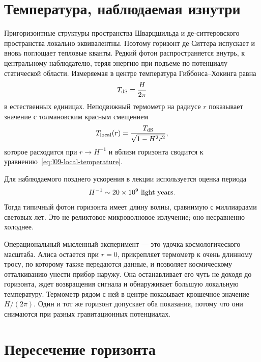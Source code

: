 \section{Температура, наблюдаемая изнутри}

Пригоризонтные структуры пространства Шварцшильда и де-ситтеровского пространства локально эквивалентны. Поэтому горизонт де Ситтера испускает и вновь поглощает тепловые кванты. Редкий фотон распространяется внутрь, к центральному наблюдателю, теряя энергию при подъеме по потенциалу статической области. Измеряемая в центре температура Гиббонса--Хокинга равна
\begin{equation}
T_{\rm dS}=\frac{H}{2\pi}
\label{eq:l09-de-sitter-temperature}
\end{equation}
в естественных единицах. Неподвижный термометр на радиусе \(r\) показывает значение с толмановским красным смещением
\begin{equation}
T_{\rm local}(r)=
\frac{T_{\rm dS}}{\sqrt{1-H^2r^2}},
\label{eq:l09-tolman}
\end{equation}
которое расходится при \(r\to H^{-1}\) и вблизи горизонта сводится к уравнению~\eqref{eq:l09-local-temperature}.


Для наблюдаемого позднего ускорения в лекции используется оценка периода
\begin{equation}
H^{-1}\sim 20\times10^9\ {\rm light\ years}.
\label{eq:l09-lecture-horizon-estimate}
\end{equation}
Тогда типичный фотон горизонта имеет длину волны, сравнимую с миллиардами световых лет. Это не реликтовое микроволновое излучение; оно несравненно холоднее.

Операциональный мысленный эксперимент — это удочка космологического масштаба. Алиса остается при \(r=0\), прикрепляет термометр к очень длинному тросу, по которому также передаются данные, и позволяет космическому отталкиванию унести прибор наружу. Она останавливает его чуть не доходя до горизонта, ждет возвращения сигнала и обнаруживает большую локальную температуру. Термометр рядом с ней в центре показывает крошечное значение \(H/(2\pi)\). Один и тот же горизонт допускает оба показания, потому что они снимаются при разных гравитационных потенциалах.

\section{Пересечение горизонта}

